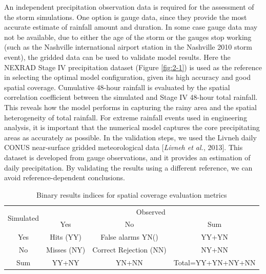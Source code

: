 An independent precipitation observation data is required for the assessment of the storm simulations. One option is gauge data, since they provide the most accurate estimate of rainfall amount and duration. In some case gauge data may not be available, due to either the age of the storm or the gauges stop working (such as the Nashville international airport station in the Nashville 2010 storm event), the gridded data can be used to validate model results. Here the NEXRAD Stage IV precipitation dataset (Figure \ref{fig:2-1}) is used as the reference in selecting the optimal model configuration, given its high accuracy and good spatial coverage. Cumulative 48-hour rainfall is evaluated by the spatial correlation coefficient between the simulated and Stage IV 48-hour total rainfall. This reveals how the model performs in capturing the rainy area and the spatial heterogeneity of total rainfall. For extreme rainfall events used in engineering analysis, it is important that the numerical model captures the core precipitating areas as accurately as possible. In the validation steps, we used the Livneh daily CONUS near-surface gridded meteorological data [\textit{Livneh et al.}, 2013]. This dataset is developed from gauge observations, and it provides an estimation of daily precipitation. By validating the results using a different reference, we can avoid reference-dependent conclusions.

\begin{table}[htbp]
	\centering
	\caption{Binary results indices for spatial coverage evaluation metrics}
	\begin{tabular}{cccc}
		\hline
		\multirow{2}{*}{Simulated} &\multicolumn{3}{c}{Observed}\\
		\cline{2-4}
		&Yes & No & Sum\\
		\hline
		Yes    &  Hits (YY)      &  False alarms YN()       & YY+YN\\
		\hline
		No     &  Misses (NY)    &  Correct Rejection (NN)  & NY+NN\\
		\hline
		Sum    &  YY+NY          &  YN+NN                   & Total=YY+YN+NY+NN\\
		\hline
	\end{tabular}
	\label{table:2-1}
\end{table}


